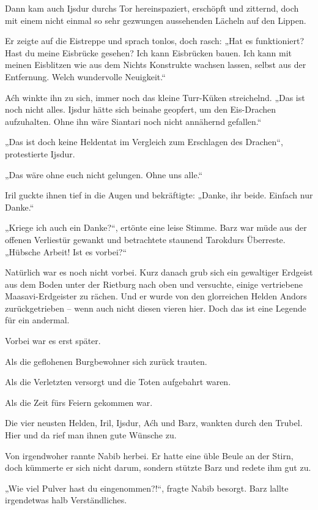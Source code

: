 Dann kam auch Ijsdur durchs Tor hereinspaziert, erschöpft und zitternd, doch mit einem nicht einmal so sehr gezwungen aussehenden Lächeln auf den Lippen.

Er zeigte auf die Eistreppe und sprach tonlos, doch rasch: „Hat es funktioniert? Hast du meine Eisbrücke gesehen? Ich kann Eisbrücken bauen. Ich kann mit meinen Eisblitzen wie aus dem Nichts Konstrukte wachsen lassen, selbst aus der Entfernung. Welch wundervolle Neuigkeit.“

Aćh winkte ihn zu sich, immer noch das kleine Turr-Küken streichelnd. „Das ist noch nicht alles. Ijsdur hätte sich beinahe geopfert, um den Eis-Drachen aufzuhalten. Ohne ihn wäre Siantari noch nicht annähernd gefallen.“

„Das ist doch keine Heldentat im Vergleich zum Erschlagen des Drachen“, protestierte Ijsdur.

„Das wäre ohne euch nicht gelungen. Ohne uns alle.“

Iril guckte ihnen tief in die Augen und bekräftigte: „Danke, ihr beide. Einfach nur Danke.“

„Kriege ich auch ein Danke?“, ertönte eine leise Stimme. Barz war müde aus der offenen Verliestür gewankt und betrachtete staunend Tarokdurs Überreste. „Hübsche Arbeit! Ist es vorbei?“\bigskip







Natürlich war es noch nicht vorbei. Kurz danach grub sich ein gewaltiger Erdgeist aus dem Boden unter der Rietburg nach oben und versuchte, einige vertriebene Maasavi-Erdgeister zu rächen. Und er wurde von den glorreichen Helden Andors zurückgetrieben – wenn auch nicht diesen vieren hier. Doch das ist eine Legende für ein andermal.

Vorbei war es erst später.

Als die geflohenen Burgbewohner sich zurück trauten.

Als die Verletzten versorgt und die Toten aufgebahrt waren.

Als die Zeit fürs Feiern gekommen war.

Die vier neusten Helden, Iril, Ijsdur, Aćh und Barz, wankten durch den Trubel. Hier und da rief man ihnen gute Wünsche zu.

Von irgendwoher rannte Nabib herbei. Er hatte eine üble Beule an der Stirn, doch kümmerte er sich nicht darum, sondern stützte Barz und redete ihm gut zu.

„Wie viel Pulver hast du eingenommen?!“, fragte Nabib besorgt. Barz lallte irgendetwas halb Verständliches.

